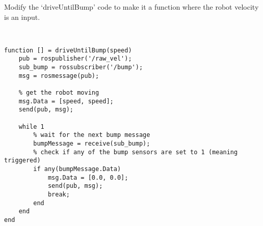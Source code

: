 Modify the ‘driveUntilBump’ code to make it a function where the robot velocity is an input.

\begin{solution} \
\begin{lstlisting}
function [] = driveUntilBump(speed)
    pub = rospublisher('/raw_vel');
    sub_bump = rossubscriber('/bump');
    msg = rosmessage(pub);

    % get the robot moving
    msg.Data = [speed, speed];
    send(pub, msg);

    while 1
        % wait for the next bump message
        bumpMessage = receive(sub_bump);
        % check if any of the bump sensors are set to 1 (meaning triggered)
        if any(bumpMessage.Data)
            msg.Data = [0.0, 0.0];
            send(pub, msg);
            break;
        end
    end
end
\end{lstlisting}
\end{solution}